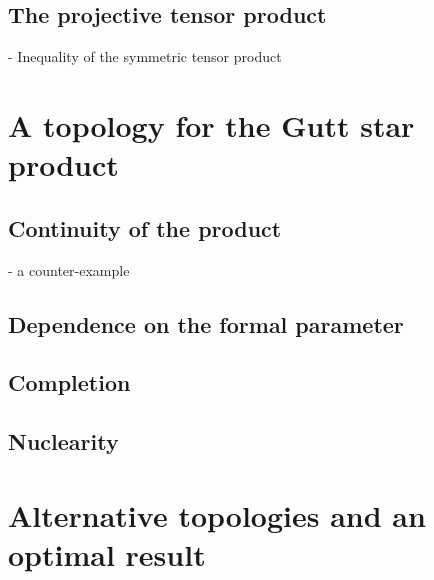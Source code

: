 \subsection{The projective tensor product}
 - Inequality of the symmetric tensor product



\section{A topology for the Gutt star product}
\label{sec:chap5_TopologyStar}

\subsection{Continuity of the product}
 - a counter-example
 
\subsection{Dependence on the formal parameter}

\subsection{Completion}

\subsection{Nuclearity}



\section{Alternative topologies and an optimal result}
\label{sec:chap5_AlternativeOptimal}

